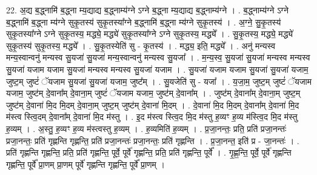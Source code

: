 \documentclass[17pt]{extarticle}
\begin{document}
22. अ॒द्य ब॒द्ध्नामि॑ ब॒द्ध्ना म्य॒द्याद्य ब॒द्ध्नाम्य॑ग्ने ऽग्ने ब॒द्ध्ना म्य॒द्याद्य ब॒द्ध्नाम्य॑ग्ने । . ब॒द्ध्नाम्य॑ग्ने ऽग्ने ब॒द्ध्नामि॑ ब॒द्ध्ना म्य॑ग्ने सुकृ॒तस्य॑ सुकृ॒तस्या᳚ग्ने ब॒द्ध्नामि॑ ब॒द्ध्ना म्य॑ग्ने सुकृ॒तस्य॑ । . अ॒ग्ने॒ सु॒कृ॒तस्य॑ सुकृ॒तस्या᳚ग्ने ऽग्ने सुकृ॒तस्य॒ मद्ध्ये॒ मद्ध्ये॑ सुकृ॒तस्या᳚ग्ने ऽग्ने सुकृ॒तस्य॒ मद्ध्ये᳚ । . सु॒कृ॒तस्य॒ मद्ध्ये॒ मद्ध्ये॑ सुकृ॒तस्य॑ सुकृ॒तस्य॒ मद्ध्ये᳚ । . सु॒कृ॒तस्येति॑ सु - कृ॒तस्य॑ । . मद्ध्य॒ इति॒ मद्ध्ये᳚ । . अनु॑ मन्यस्व मन्य॒स्वान्वनु॑ मन्यस्व सु॒यजा॑ सु॒यजा॑ मन्य॒स्वान्वनु॑ मन्यस्व सु॒यजा᳚ । . म॒न्य॒स्व॒ सु॒यजा॑ सु॒यजा॑ मन्यस्व मन्यस्व सु॒यजा॑ यजाम यजाम सु॒यजा॑ मन्यस्व मन्यस्व सु॒यजा॑ यजाम । . सु॒यजा॑ यजाम यजाम सु॒यजा॑ सु॒यजा॑ यजाम॒ जुष्ट॒म् जुष्टं॑ ॅयजाम सु॒यजा॑ सु॒यजा॑ यजाम॒ जुष्ट᳚म् । . सु॒यजेति॑ सु - यजा᳚ । . य॒जा॒म॒ जुष्ट॒म् जुष्टं॑ ॅयजाम यजाम॒ जुष्ट॑म् दे॒वाना᳚म् दे॒वाना॒म् जुष्टं॑ ॅयजाम यजाम॒ जुष्ट॑म् दे॒वाना᳚म् । . जुष्ट॑म् दे॒वाना᳚म् दे॒वाना॒म् जुष्ट॒म् जुष्ट॑म् दे॒वाना॑ मि॒द मि॒दम् दे॒वाना॒म् जुष्ट॒म् जुष्ट॑म् दे॒वाना॑ मि॒दम् । . दे॒वाना॑ मि॒द मि॒दम् दे॒वाना᳚म् दे॒वाना॑ मि॒द म॑स्त्व स्त्वि॒दम् दे॒वाना᳚म् दे॒वाना॑ मि॒द म॑स्तु । . इ॒द म॑स्त्व स्त्वि॒द मि॒द म॑स्तु ह॒व्यꣳ ह॒व्य म॑स्त्वि॒द मि॒द म॑स्तु ह॒व्यम् । . अ॒स्तु॒ ह॒व्यꣳ ह॒व्य म॑स्त्वस्तु ह॒व्यम् । . ह॒व्यमिति॑ ह॒व्यम् । . प्र॒जा॒नन्तः॒ प्रति॒ प्रति॑ प्रजा॒नन्तः॑ प्रजा॒नन्तः॒ प्रति॑ गृह्णन्ति गृह्णन्ति॒ प्रति॑ प्रजा॒नन्तः॑ प्रजा॒नन्तः॒ प्रति॑ गृह्णन्ति । . प्र॒जा॒नन्त॒ इति॑ प्र - जा॒नन्तः॑ । . प्रति॑ गृह्णन्ति गृह्णन्ति॒ प्रति॒ प्रति॑ गृह्णन्ति॒ पूर्वे॒ पूर्वे॑ गृह्णन्ति॒ प्रति॒ प्रति॑ गृह्णन्ति॒ पूर्वे᳚ । . गृ॒ह्ण॒न्ति॒ पूर्वे॒ पूर्वे॑ गृह्णन्ति गृह्णन्ति॒ पूर्वे᳚ प्रा॒णम् प्रा॒णम् पूर्वे॑ गृह्णन्ति गृह्णन्ति॒ पूर्वे᳚ प्रा॒णम् । \newline
\end{document}
